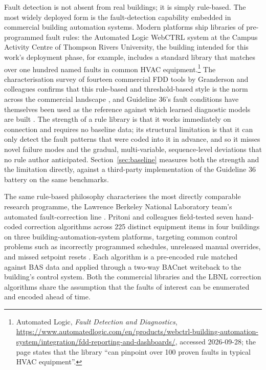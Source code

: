 \documentclass[11pt,letterpaper]{article}
\begin{document}
Fault detection is not absent from real buildings; it is simply rule-based. The most widely deployed form is the fault-detection capability embedded in commercial building automation systems. Modern platforms ship libraries of pre-programmed fault rules: the Automated Logic WebCTRL system at the Campus Activity Centre of Thompson Rivers University, the building intended for this work's deployment phase, for example, includes a standard library that matches over one hundred named faults in common HVAC equipment.\footnote{Automated Logic, \emph{Fault Detection and Diagnostics}, \url{https://www.automatedlogic.com/en/products/webctrl-building-automation-system/integration/fdd-reporting-and-dashboards/}, accessed 2026-09-28; the page states that the library ``can pinpoint over 100 proven faults in typical HVAC equipment''.} The characterisation survey of fourteen commercial FDD tools by Granderson and colleagues confirms that this rule-based and threshold-based style is the norm across the commercial landscape \cite{granderson2017fddtoolsurvey}, and Guideline 36's fault conditions have themselves been used as the reference against which learned diagnostic models are built \cite{pradhan2021dbng36}. The strength of a rule library is that it works immediately on connection and requires no baseline data; its structural limitation is that it can only detect the fault patterns that were coded into it in advance, and so it misses novel failure modes and the gradual, multi-variable, sequence-level deviations that no rule author anticipated. Section~\ref{sec:baseline} measures both the strength and the limitation directly, against a third-party implementation of the Guideline 36 battery on the same benchmarks.

The same rule-based philosophy characterises the most directly comparable research programme, the Lawrence Berkeley National Laboratory team's automated fault-correction line \cite{lin2020faultcorrection,lin2023controlhunting}. Pritoni and colleagues field-tested seven hand-coded correction algorithms across 225 distinct equipment items in four buildings on three building-automation-system platforms, targeting common control problems such as incorrectly programmed schedules, unreleased manual overrides, and missed setpoint resets \cite{pritoni2022faultcorrection}. Each algorithm is a pre-encoded rule matched against BAS data and applied through a two-way BACnet writeback to the building's control system. Both the commercial libraries and the LBNL correction algorithms share the assumption that the faults of interest can be enumerated and encoded ahead of time.
\end{document}
